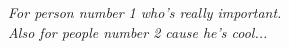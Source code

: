 
\begin{dedication}
  \begin{flushright}
  \emph{
  For person number 1 who's really important. \bigskip\\
  Also for people number 2 cause he's cool... \bigskip\\
  }
  \end{flushright}
\end{dedication}
